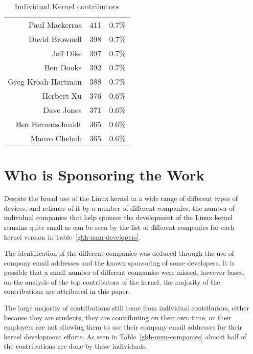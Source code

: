\documentclass[final]{ols}
\begin{document}
\begin{table}[btph]
\begin{center}
\begin{small}
\begin{tabular}{|r|r|r|}
Paul Mackerras           &  411 & 0.7\% \\
David Brownell           &  398 & 0.7\% \\
Jeff Dike                &  397 & 0.7\% \\
Ben Dooks                &  392 & 0.7\% \\
Greg Kroah-Hartman       &  388 & 0.7\% \\
Herbert Xu               &  376 & 0.6\% \\
Dave Jones               &  371 & 0.6\% \\
Ben Herrenschmidt        &  365 & 0.6\% \\
Mauro  Chehab    &  365 & 0.6\% \\
\hline
\end{tabular}
\end{small}
\caption{Individual Kernel contributors}
\label{gkh-individuals}
\end{center}
\end{table}


\section{Who is Sponsoring the Work}

Despite the broad use of the Linux kernel in a wide range of different
types of devices, and reliance of it by a number of different companies,
the number of individual companies that help sponsor the development of
the Linux kernel remains quite small as can be seen by the list of
different companies for each kernel version in Table~\ref{gkh-num-developers}.

The identification of the different companies was deduced through the
use of company email addresses and the known sponsoring of some
developers.  It is possible that a small number of different companies
were missed, however based on the analysis of the top contributors of
the kernel, the majority of the contributions are attributed in this
paper.

The large majority of contributions still come from individual
contributors, either because they are students, they are contributing on
their own time, or their employers are not allowing them to use their
company email addresses for their kernel development efforts.  As seen
in Table~\ref{gkh-num-companies} almost half of the contributions are
done by these individuals.
\end{document}
